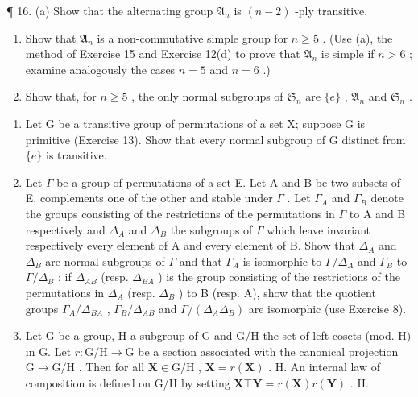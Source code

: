 ¶ 16. (a) Show that the alternating group \(\mathfrak{A}_n\) is \((n - 2)\) -ply transitive.

\begin{enumerate}
\def\labelenumi{(\alph{enumi})}
\setcounter{enumi}{1}
\item
  Show that \(\mathfrak{A}_n\) is a non-commutative simple group for \(n \geqslant 5\) . (Use (a), the method of Exercise 15 and Exercise 12(d) to prove that \(\mathfrak{A}_n\) is simple if \(n > 6\) ; examine analogously the cases \(n = 5\) and \(n = 6\) .)
\item
  Show that, for \(n \geqslant 5\) , the only normal subgroups of \(\mathfrak{S}_n\) are \(\{e\}\) , \(\mathfrak{A}_n\) and \(\mathfrak{S}_n\) .
\end{enumerate}

\begin{enumerate}
\def\labelenumi{\arabic{enumi}.}
\setcounter{enumi}{16}
\item
  Let G be a transitive group of permutations of a set X; suppose G is primitive (Exercise 13). Show that every normal subgroup of G distinct from \(\{e\}\) is transitive.
\item
  Let \(\Gamma\) be a group of permutations of a set E. Let A and B be two subsets of E, complements one of the other and stable under \(\Gamma\) . Let \(\Gamma_{A}\) and \(\Gamma_{B}\) denote the groups consisting of the restrictions of the permutations in \(\Gamma\) to A and B respectively and \(\Delta_{A}\) and \(\Delta_{B}\) the subgroups of \(\Gamma\) which leave invariant respectively every element of A and every element of B. Show that \(\Delta_{A}\) and \(\Delta_{B}\) are normal subgroups of \(\Gamma\) and that \(\Gamma_{A}\) is isomorphic to \(\Gamma/\Delta_{A}\) and \(\Gamma_{B}\) to \(\Gamma/\Delta_{B}\) ; if \(\Delta_{AB}\) (resp. \(\Delta_{BA}\) ) is the group consisting of the restrictions of the permutations in \(\Delta_{A}\) (resp. \(\Delta_{B}\) ) to B (resp. A), show that the quotient groups \(\Gamma_{A}/\Delta_{BA}\) , \(\Gamma_{B}/\Delta_{AB}\) and \(\Gamma/(\Delta_{A}\Delta_{B})\) are isomorphic (use Exercise 8).
\item
  Let G be a group, H a subgroup of G and G/H the set of left cosets (mod. H) in G. Let \(r: \mathrm{G} / \mathrm{H} \to \mathrm{G}\) be a section associated with the canonical projection \(\mathrm{G} \to \mathrm{G} / \mathrm{H}\) . Then for all \(\mathbf{X} \in \mathrm{G} / \mathrm{H}\) , \(\mathbf{X} = r(\mathbf{X})\) . H. An internal law of composition is defined on G/H by setting \(\mathbf{X} \top \mathbf{Y} = r(\mathbf{X})r(\mathbf{Y})\) . H.
\end{enumerate}

